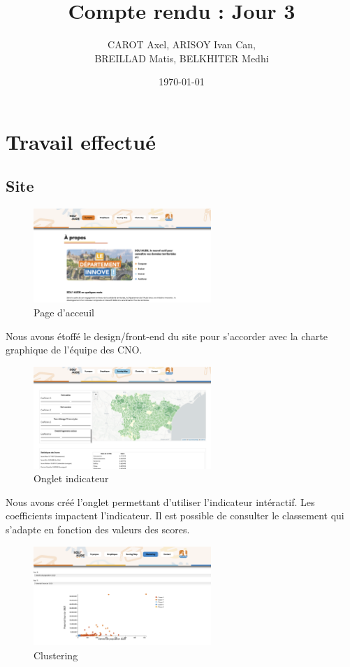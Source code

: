 \documentclass{article}
\title{Compte rendu : Jour 3}
\author{CAROT Axel, ARISOY Ivan Can, \\ BREILLAD Matis, BELKHITER Medhi}
\date{\today}
\begin{document}
\maketitle

\section{Travail effectué}

\subsection{Site}

\begin{figure}[h]
    \centering
    \includegraphics[width=0.6\textwidth]{1.png}
    \caption{Page d'acceuil}
    \label{fig:Page d'acceuil}
\end{figure}

Nous avons étoffé le design/front-end du site pour s'accorder avec la charte graphique de l'équipe des CNO.

\begin{figure}[h]
    \centering
    \includegraphics[width=0.6\textwidth]{2.png}
    \caption{Onglet indicateur}
    \label{fig:Site}
\end{figure}

Nous avons créé l'onglet permettant d'utiliser l'indicateur intéractif. Les coefficients impactent l'indicateur. Il est possible de consulter le classement qui s'adapte en fonction des valeurs des scores. 

\begin{figure}[h]
    \centering
    \includegraphics[width=0.6\textwidth]{3.png}
    \caption{Clustering}
    \label{fig:Clustering}
\end{figure}
\vspace{20cm}
\end{document}
